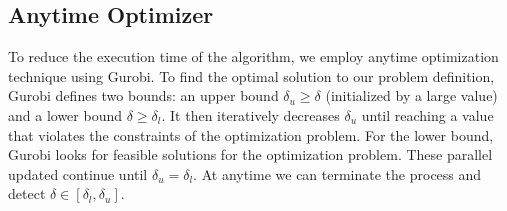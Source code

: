 \subsection{Anytime Optimizer}
To reduce the execution time of the algorithm, we employ anytime optimization technique using Gurobi. To find the optimal solution to our problem definition, Gurobi defines two bounds: an upper bound $\delta_u\geq\delta$ (initialized by a large value) and a lower bound $\delta\geq\delta_l$. It then iteratively decreases $\delta_u$ until reaching a value that violates the constraints of the optimization problem. For the lower bound, Gurobi looks for feasible solutions for the optimization problem. These parallel updated continue until $\delta_u=\delta_l$. At anytime we can terminate the process and detect $\delta\in[\delta_l,\delta_u]$. 